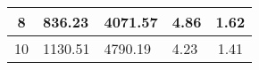\begin{table}
\begin{tabular}{|c|l|l|l|c|}
8                                                                                                                  & 836.23                                                                                                                                                    & 4071.57                                                                                                                       & 4.86                              & 1.62           \\ \hline
10                                                                                                                 & 1130.51                                                                                                                                                    & 4790.19                                                                                                                       & 4.23                              & 1.41          \\ \hline
\end{tabular}
\end{table}


